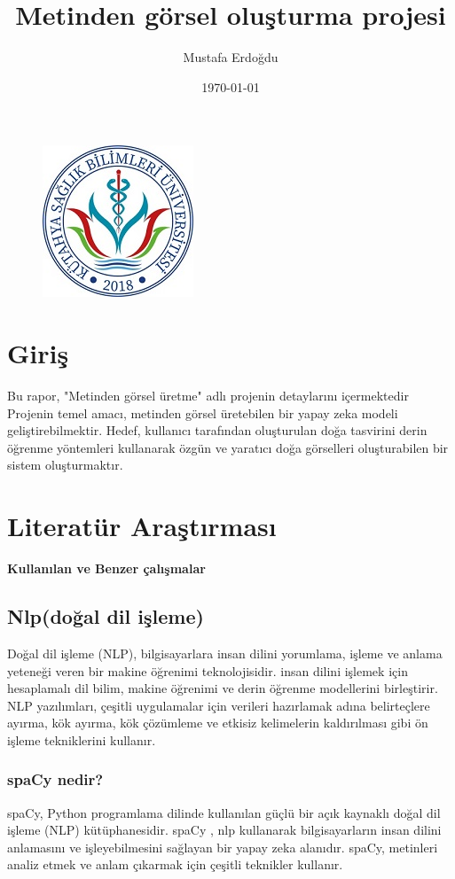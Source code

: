 \documentclass[12pt, a4paper]{article}
\title{Metinden görsel oluşturma projesi}
\author{Mustafa Erdoğdu}
\date{\today}
\begin{document}
	
			
			\begin{figure}[h]
				\centering
				\includegraphics{ksbu.png}
			\end{figure}
			\maketitle
			\thispagestyle{empty}
			
		

			\section{Giriş}		
			Bu rapor, "Metinden görsel üretme" adlı projenin detaylarını içermektedir
			Projenin temel amacı, metinden görsel üretebilen bir yapay zeka modeli geliştirebilmektir.
			Hedef, kullanıcı tarafından oluşturulan doğa tasvirini derin öğrenme yöntemleri kullanarak özgün ve yaratıcı doğa görselleri oluşturabilen bir sistem oluşturmaktır.
			
			\section{Literatür Araştırması}
			
				\textbf{Kullanılan ve Benzer çalışmalar}
			
			\subsection{Nlp(doğal dil işleme)}		
			Doğal dil işleme (NLP), bilgisayarlara insan dilini yorumlama, işleme ve anlama yeteneği veren bir makine öğrenimi teknolojisidir. insan dilini işlemek için hesaplamalı dil bilim, makine öğrenimi ve derin öğrenme modellerini birleştirir. NLP yazılımları, çeşitli uygulamalar için verileri hazırlamak adına belirteçlere ayırma, kök ayırma, kök çözümleme ve etkisiz kelimelerin kaldırılması gibi ön işleme tekniklerini kullanır.\cite{derinOgrenme}	 
			\subsubsection{spaCy nedir?}
			spaCy, Python programlama dilinde kullanılan güçlü bir açık kaynaklı doğal dil işleme (NLP) kütüphanesidir. spaCy , nlp kullanarak bilgisayarların insan dilini anlamasını ve işleyebilmesini sağlayan bir yapay zeka alanıdır. spaCy, metinleri analiz etmek ve anlam çıkarmak için çeşitli teknikler kullanır.\cite{spaCy}\\	
\end{document}
